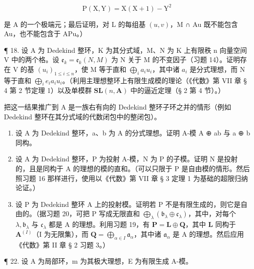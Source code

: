 \[
\mathrm{P} (\mathrm{X}, \mathrm{Y}) = \mathrm{X} (\mathrm{X} + 1) - \mathrm{Y} ^ {2}
\]

是 A 的一个极端元；最后证明，对 L 的每组基 \((u, v)\)，M ∩ Au 既不能包含 Au，也不能包含于 APu。）

¶ 18. 设 A 为 Dedekind 整环，K 为其分式域，M、N 为 K 上有限秩 n 向量空间 V 中的两个格。设 \(\mathfrak{e}_{k} = \mathfrak{e}_{k}(N, M)\) 为 N 关于 M 的不变因子（习题 14）。证明存在 V 的基 \((u_{i})_{1 \leqslant i \leqslant n}\)，使 M 等于直和 \(\bigoplus_{i} a_{i} u_{i}\)，其中诸 \(a_{i}\) 是分式理想，而 N 等于直和 \(\bigoplus_{i} e_{i} a_{i} u_{i}\)。（利用主理想整环上有限生成模的理论（《代数》第 VII 章 § 4 第 2 节定理 1）以及单模群 \(\mathbf{SL}(n, \mathbf{A})\) 中的逼近定理（§ 2 第 4 节）。）

把这一结果推广到 A 是一族右有向的 Dedekind 整环子环之并的情形（例如 Dedekind 整环在其分式域的代数闭包中的整闭包）。

\begin{enumerate}
\def\labelenumi{\arabic{enumi}.}
\setcounter{enumi}{18}
\item
  设 A 为 Dedekind 整环，a、b 为 A 的分式理想。证明 A-模 A ⊕ ab 与 a ⊕ b 同构。
\item
  设 A 为 Dedekind 整环，P 为投射 A-模，N 为 P 的子模。证明 N 是投射的，且是同构于 A 的理想的模的直和。（可以只限于 P 是自由模的情形。然后照习题 16 那样进行，使用以《代数》第 VII 章 § 3 定理 1 为基础的超限归纳论证。）
\item
  设 P 为 Dedekind 整环 A 上的投射模。证明若 P 不是有限生成的，则它是自由的。（据习题 20，可把 P 写成无限直和 \(\bigoplus_{\lambda} (\mathfrak{b}_{\lambda} \oplus \mathfrak{c}_{\lambda})\)，其中，对每个 \(\lambda, \mathfrak{b}_{\lambda}\) 与 \(\mathfrak{c}_{\lambda}\) 都是 A 的理想。利用习题 19，有 \(\mathbf{P} = \mathbf{L} \oplus \mathbf{Q}\)，其中 \(\mathbf{L}\) 同构于 \(\mathbf{A}^{(I)}\)（I 为无限集），而 \(\mathbf{Q} = \bigoplus_{\alpha \in I} \mathfrak{a}_{\alpha}\)，其中诸 \(\mathfrak{a}_{\alpha}\) 是 A 的理想。然后应用《代数》第 II 章 § 2 习题 3。）
\end{enumerate}

¶ 22. 设 A 为局部环，m 为其极大理想，E 为有限生成 A-模。

